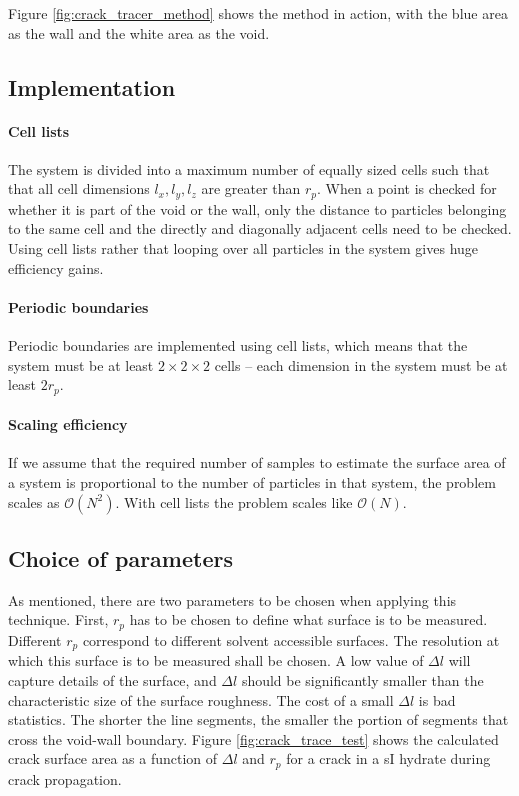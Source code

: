 Figure \ref{fig:crack_tracer_method} shows the method in action, with the blue area as the wall and the white area as the void. 

\subsection{Implementation}
\paragraph{Cell lists}
The system is divided into a maximum number of equally sized cells such that that all cell dimensions $l_x, l_y, l_z$ are greater than $r_p$. When a point is checked for whether it is part of the void or the wall, only the distance to particles belonging to the same cell and the directly and diagonally adjacent cells need to be checked. Using cell lists rather that looping over all particles in the system gives huge efficiency gains.
\paragraph{Periodic boundaries}
Periodic boundaries are implemented using cell lists, which means that the system must be at least $2\times 2 \times 2$ cells – each dimension in the system must be at least $2r_p$.
\paragraph{Scaling efficiency}
If we assume that the required number of samples to estimate the surface area of a system is proportional to the number of particles in that system, the problem scales as $\mathcal{O}(N^2)$. With cell lists the problem scales like $\mathcal{O}(N)$.

\subsection{Choice of parameters}
As mentioned, there are two parameters to be chosen when applying this technique. First, $r_p$ has to be chosen to define what surface is to be measured. Different $r_p$ correspond to different solvent accessible surfaces. The resolution at which this surface is to be measured shall be chosen. A low value of $\Delta l$ will capture details of the surface, and $\Delta l$ should be significantly smaller than the characteristic size of the surface roughness. The cost of a small $\Delta l$ is bad statistics. The shorter the line segments, the smaller the portion of segments that cross the void-wall boundary. Figure \ref{fig:crack_trace_test} shows the calculated crack surface area as a function of $\Delta l$ and $r_p$ for a crack in a sI hydrate during crack propagation. 

